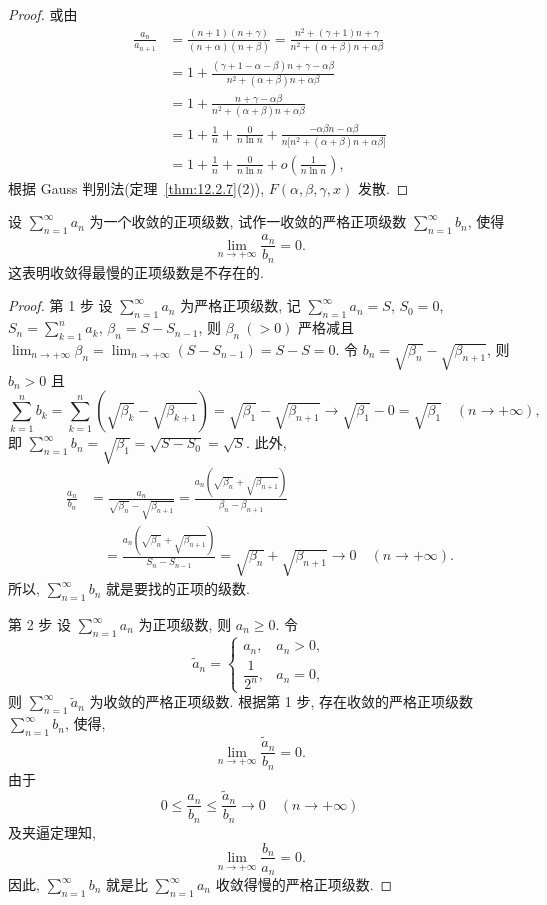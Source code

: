 \begin{proof}
或由
\begin{align*}
  \frac{a_{n}}{a_{n+1}}
  &=\frac{(n+1)(n+\gamma)}{(n+\alpha)(n+\beta)}
   =\frac{n^{2}+(\gamma+1)n+\gamma}{n^{2}+(\alpha+\beta)n+\alpha\beta} \\
  &=1+\frac{(\gamma+1-\alpha-\beta)n+\gamma-\alpha\beta}{n^{2}+(\alpha+\beta)n+\alpha\beta} \\
  &=1+\frac{n+\gamma-\alpha\beta}{n^{2}+(\alpha+\beta)n+\alpha\beta} \\
  &=1+\frac{1}{n}+\frac{0}{n\ln n}
   +\frac{-\alpha\beta n-\alpha\beta}{n\bigl[n^{2}+(\alpha+\beta)n+\alpha\beta\bigr]} \\
  &=1+\frac{1}{n}+\frac{0}{n\ln n}+o\left(\frac{1}{n\ln n}\right),
\end{align*}
根据 Gauss 判别法(定理~\ref{thm:12.2.7}(2)), $F(\alpha,\beta,\gamma,x)$ 发散.
\end{proof}

\begin{example}\label{ex:12.2.17}
设 $\sum_{n=1}^{\infty}a_{n}$ 为一个收敛的正项级数, 试作一收敛的严格正项级数 $\sum_{n=1}^{\infty}b_{n}$, 使得
\[
  \lim_{n\to+\infty}\frac{a_{n}}{b_{n}}=0.
\]
这表明收敛得最慢的正项级数是不存在的.
\end{example}

\begin{proof}
第 1 步 设 $\sum_{n=1}^{\infty}a_{n}$ 为严格正项级数, 记 $\sum_{n=1}^{\infty}a_{n}=S$, $S_{0}=0$, $S_{n}=\sum_{k=1}^{n}a_{k}$, $\beta_{n}=S-S_{n-1}$, 则 $\beta_{n}\ (>0)$ 严格减且 $\lim_{n\to+\infty}\beta_{n}=\lim_{n\to+\infty}(S-S_{n-1})=S-S=0$. 令 $b_{n}=\sqrt{\beta_{n}}-\sqrt{\beta_{n+1}}$, 则 $b_{n}>0$ 且
\[
  \sum_{k=1}^{n}b_{k}
  =\sum_{k=1}^{n}\left(\sqrt{\beta_{k}}-\sqrt{\beta_{k+1}}\right)
  =\sqrt{\beta_{1}}-\sqrt{\beta_{n+1}}
  \rightarrow\sqrt{\beta_{1}}-0=\sqrt{\beta_{1}}\quad(n\to+\infty),
\]
即 $\sum_{n=1}^{\infty}b_{n}=\sqrt{\beta_{1}}=\sqrt{S-S_{0}}=\sqrt{S}$. 此外,
\begin{align*}
  \frac{a_{n}}{b_{n}}
  &=\frac{a_{n}}{\sqrt{\beta_{n}}-\sqrt{\beta_{n+1}}}
   =\frac{a_{n}\left(\sqrt{\beta_{n}}+\sqrt{\beta_{n+1}}\right)}{\beta_{n}-\beta_{n+1}} \\
  &\quad =\frac{a_{n}\left(\sqrt{\beta_{n}}+\sqrt{\beta_{n+1}}\right)}{S_{n}-S_{n-1}}
   =\sqrt{\beta_{n}}+\sqrt{\beta_{n+1}}\rightarrow0\quad(n\to+\infty).
\end{align*}
所以, $\sum_{n=1}^{\infty}b_{n}$ 就是要找的正项的级数.

第 2 步 设 $\sum_{n=1}^{\infty}a_{n}$ 为正项级数, 则 $a_{n}\geqslant0$. 令
\[
  \tilde{a}_{n}=
  \begin{cases}
  a_{n}, & a_{n}>0,\\[2pt]
  \dfrac{1}{2^{n}}, & a_{n}=0,
\end{cases}
\]
则 $\sum_{n=1}^{\infty}\tilde{a}_{n}$ 为收敛的严格正项级数. 根据第 1 步, 存在收敛的严格正项级数 $\sum_{n=1}^{\infty}b_{n}$, 使得,
\[
  \lim_{n\to+\infty}\frac{\tilde{a}_{n}}{b_{n}}=0.
\]
由于
\[
  0\leqslant\frac{a_{n}}{b_{n}}\leqslant\frac{\tilde{a}_{n}}{b_{n}}\to0\quad(n\to+\infty)
\]
及夹逼定理知,
\[
  \lim_{n\to+\infty}\frac{b_{n}}{a_{n}}=0.
\]
因此, $\sum_{n=1}^{\infty}b_{n}$ 就是比 $\sum_{n=1}^{\infty}a_{n}$ 收敛得慢的严格正项级数.
\end{proof}


